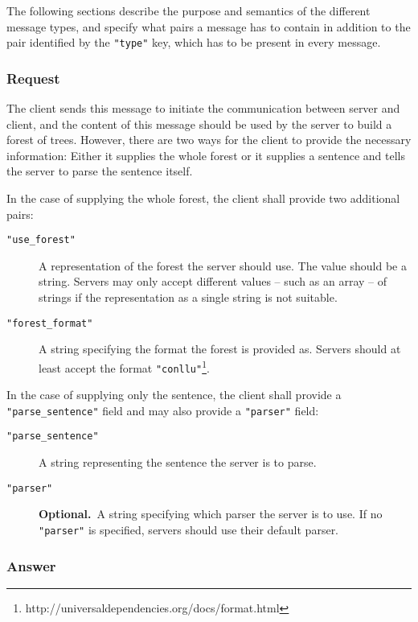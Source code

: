 \documentclass{scrartcl}
\newcommand{\jsstring}[1]{\texttt{\color{OrangeRed}"#1"}}
\newcommand{\optional}{\textbf{Optional.}}
\begin{document}
The following sections describe the purpose and semantics of the different message types,
and specify what pairs a message has to contain in addition to the pair identified by the \jsstring{type} key,
which has to be present in every message.

\subsubsection{Request}
\label{ssub:Request}

The client sends this message to initiate the communication between server and client,
and the content of this message should be used by the server to build a forest of trees.
However, there are two ways for the client to provide the necessary information:
Either it supplies the whole forest or it supplies a sentence and tells the server to parse the sentence itself.

In the case of supplying the whole forest, the client shall provide two additional pairs:
\begin{description}
    \item[\jsstring{use\_forest}] A representation of the forest the server should use.
        The value should be a string.
        Servers may only accept different values – such as an array – of strings if the representation as a single string is not suitable.
    \item[\jsstring{forest\_format}] A string specifying the format the forest is provided as.
        Servers should at least accept the format \jsstring{conllu}\footnote{http://universaldependencies.org/docs/format.html}.
\end{description}
In the case of supplying only the sentence, the client shall provide a \jsstring{parse\_sentence} field and may also provide a \jsstring{parser} field:
\begin{description}
    \item[\jsstring{parse\_sentence}] A string representing the sentence the server is to parse.
    \item[\jsstring{parser}] \optional\ A string specifying which parser the server is to use.
        If no \jsstring{parser} is specified, servers should use their default parser.
\end{description}

\subsubsection{Answer}
\label{ssub:Answer}
\end{document}
